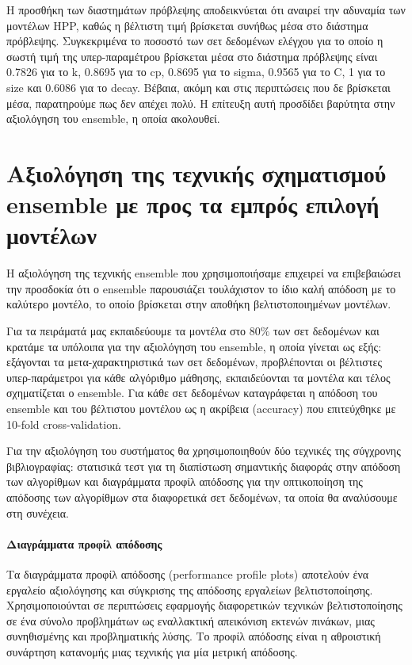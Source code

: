 Η προσθήκη των διαστημάτων πρόβλεψης αποδεικνύεται ότι αναιρεί την αδυναμία των μοντέλων HPP, καθώς η βέλτιστη τιμή βρίσκεται συνήθως μέσα στο διάστημα πρόβλεψης. Συγκεκριμένα το ποσοστό των σετ δεδομένων ελέγχου για το οποίο η σωστή τιμή της υπερ-παραμέτρου βρίσκεται μέσα στο διάστημα πρόβλεψης είναι 0.7826 για το k, 0.8695 για το cp, 0.8695 για το sigma, 0.9565 για το C, 1 για το size και 0.6086 για το decay. Βέβαια, ακόμη και στις περιπτώσεις που δε βρίσκεται μέσα, παρατηρούμε πως δεν απέχει πολύ. Η επίτευξη αυτή προσδίδει βαρύτητα στην αξιολόγηση του ensemble, η οποία ακολουθεί.  

\section{Αξιολόγηση της τεχνικής σχηματισμού ensemble με προς τα εμπρός επιλογή μοντέλων} \label{section:tensemble}
H αξιολόγηση της τεχνικής ensemble που χρησιμοποιήσαμε επιχειρεί να επιβεβαιώσει την προσδοκία ότι ο ensemble παρουσιάζει τουλάχιστον το ίδιο καλή απόδοση με το καλύτερο μοντέλο, το οποίο βρίσκεται στην αποθήκη βελτιστοποιημένων μοντέλων. 

Για τα πειράματά μας εκπαιδεύουμε τα μοντέλα στο $80\%$ των σετ δεδομένων και κρατάμε τα υπόλοιπα για την αξιολόγηση του ensemble, η οποία γίνεται ως εξής: εξάγονται τα μετα-χαρακτηριστικά των σετ δεδομένων, προβλέπονται οι βέλτιστες υπερ-παράμετροι για κάθε αλγόριθμο μάθησης, εκπαιδεύονται τα μοντέλα και τέλος σχηματίζεται ο ensemble. Για κάθε σετ δεδομένων καταγράφεται η απόδοση του ensemble και του βέλτιστου μοντέλου ως η ακρίβεια (accuracy) που επιτεύχθηκε με 10-fold cross-validation. 

Για την αξιολόγηση του συστήματος θα χρησιμοποιηθούν δύο τεχνικές της σύγχρονης βιβλιογραφίας: στατισικά τεστ για τη διαπίστωση σημαντικής διαφοράς στην απόδοση των αλγορίθμων και διαγράμματα προφίλ απόδοσης για την οπτικοποίηση της απόδοσης των αλγορίθμων στα διαφορετικά σετ δεδομένων, τα οποία θα αναλύσουμε στη συνέχεια.

\paragraph{Διαγράμματα προφίλ απόδοσης} 	Τα διαγράμματα προφίλ απόδοσης (performance profile plots) \citep{Dolan2002} αποτελούν ένα εργαλείο αξιολόγησης και σύγκρισης της απόδοσης εργαλείων βελτιστοποίησης. Χρησιμοποιούνται σε περιπτώσεις εφαρμογής διαφορετικών τεχνικών βελτιστοποίησης σε ένα σύνολο προβλημάτων ως εναλλακτική απεικόνιση εκτενών πινάκων, μιας συνηθισμένης και προβληματικής λύσης. Το προφίλ απόδοσης είναι η αθροιστική συνάρτηση κατανομής μιας τεχνικής για μία μετρική απόδοσης.

